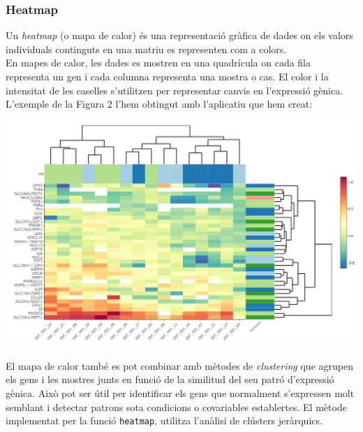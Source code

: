 \documentclass[english]{article}
\begin{document}
\subsubsection{Heatmap}
\label{2.4.1}
Un \textit{heatmap} (o mapa de calor) és una representació gràfica de dades on els valors individuals continguts en una matriu es representen com a colors.
\\

En mapes de calor, les dades es mostren en una quadrícula on cada fila representa un gen i cada columna representa una mostra o cas. El color i la intensitat de les caselles s'utilitzen per representar canvis en l'expressió gènica.
\\

L'exemple de la Figura 2 l'hem obtingut amb l'aplicatiu que hem creat:
\begin{center}
\includegraphics[scale=0.2]{heatmap.png}
\end{center}

El mapa de calor també es pot combinar amb mètodes de \textit{clustering} que agrupen els gens i les mostres junts en funció de la similitud del seu patró d'expressió gènica. Això pot ser útil per identificar els gens que normalment s'expressen molt semblant i detectar patrons sota condicions o covariables establertes. El mètode implementat per la funció \texttt{heatmap}, utilitza l'anàlisi de clústers jeràrquics.
\\
\end{document}
